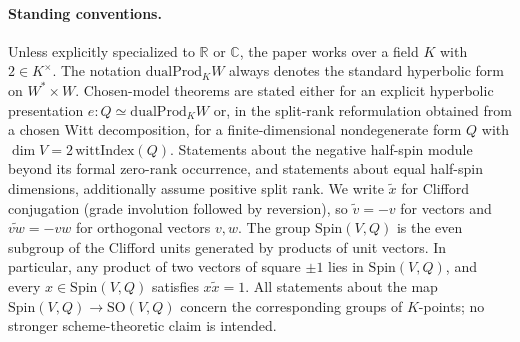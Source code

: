 \documentclass{birkjour}
\theoremstyle{plain}
\theoremstyle{definition}
\theoremstyle{remark}
\newcommand{\Spin}{\mathrm{Spin}}
\newcommand{\SO}{\mathrm{SO}}
\newcommand{\dualProd}{\mathrm{dualProd}}
\begin{document}
\paragraph{Standing conventions.}
Unless explicitly specialized to $\mathbb{R}$ or $\mathbb{C}$, the paper works
over a field $K$ with $2\in K^\times$. The notation $\dualProd_K W$ always
denotes the standard hyperbolic form on $W^* \times W$. Chosen-model theorems
are stated either for an explicit hyperbolic presentation
$e:Q \simeq \dualProd_K W$ or, in the split-rank reformulation obtained from a
chosen Witt decomposition, for a
finite-dimensional nondegenerate form $Q$ with
$\dim V = 2\,\mathrm{wittIndex}(Q)$. Statements about the negative half-spin
module beyond its formal zero-rank occurrence, and statements about equal
half-spin dimensions, additionally assume positive split rank.
We write $\tilde x$ for Clifford conjugation (grade involution followed by
reversion), so $\tilde v=-v$ for vectors and $\widetilde{vw}=-vw$ for
orthogonal vectors $v,w$. The group $\Spin(V,Q)$ is the even subgroup of the
Clifford units generated by products of unit vectors. In particular, any
product of two vectors of square $\pm1$ lies in $\Spin(V,Q)$, and every
$x\in \Spin(V,Q)$ satisfies $x\tilde x=1$.
All statements about the map $\Spin(V,Q)\to\SO(V,Q)$ concern the corresponding
groups of $K$-points; no stronger scheme-theoretic claim is intended.
\end{document}

